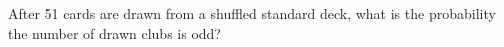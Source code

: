 After 51 cards are drawn from a shuffled standard deck, what is the probability the number of drawn clubs is odd?
